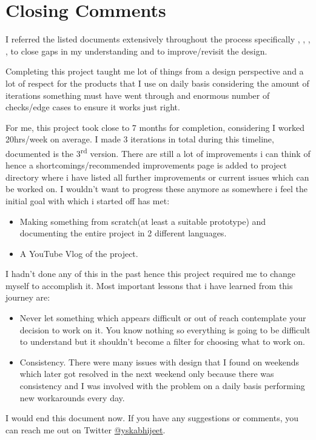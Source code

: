 \documentclass[10pt,a4paper]{article}
\begin{document}
	\pagebreak
	\section{Closing Comments}
	
	I referred the listed documents extensively throughout the process specifically \cite{nxp}, \cite{ti}, \cite{micro}, \cite{oxf}, \cite{wuk} to close gaps in my understanding and to improve/revisit the design.\par
	\bigskip
	Completing this project taught me lot of things from a design perspective and a lot of respect for the products that I use on daily basis considering the amount of iterations something must have went through and enormous number of checks/edge cases to ensure it works just right.
	
	For me, this project took close to 7 months for completion, considering I worked 20hrs/week on average. I made 3 iterations in total during this timeline, documented is the 3\textsuperscript{rd} version. There are still a lot of improvements i can think of hence a shortcomings/recommended improvements page is added to project directory where i have listed all further improvements or current issues which can be worked on. I wouldn't want to progress these anymore as somewhere i feel the initial goal with which i started off has met:
	
	\begin{itemize}
		\item Making something from scratch(at least a suitable prototype) and documenting the entire project in 2 different languages.
		\item A YouTube Vlog of the project.
	\end{itemize}

	I hadn't done any of this in the past hence this project required me to change myself to accomplish it. Most important lessons that i have learned from this journey are:
	
	\begin{itemize}
	\item Never let something which appears difficult or out of reach contemplate your decision to work on it. You know nothing so everything is going to be difficult to understand but it shouldn't become a filter for choosing what to work on.
	
	\item Consistency. There were many issues with design that I found on weekends which later got resolved in the next weekend only because there was consistency and I was involved with the problem on a daily basis performing new workarounds every day.
	\end{itemize}

	\bigskip
	I would end this document now. If you have any suggestions or comments, you can reach me out on Twitter
	\href{https://twitter.com/yskabhijeet}{@yskabhijeet}.
	

	
\end{document}
